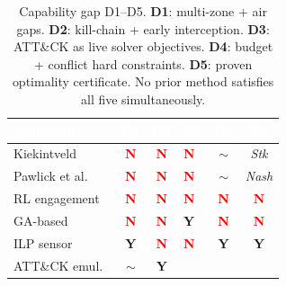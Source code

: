 \documentclass[journal]{IEEEtran}
\begin{document}
\begin{table}[!htb]
\caption{Capability gap D1--D5. \textbf{D1}: multi-zone + air gaps.
  \textbf{D2}: kill-chain + early interception. \textbf{D3}: ATT\&CK
  as live solver objectives. \textbf{D4}: budget + conflict hard
  constraints. \textbf{D5}: proven optimality certificate.
  No prior method satisfies all five simultaneously.}
\label{tab:capability}
\centering
\small
\renewcommand{\arraystretch}{1.2}
\setlength{\tabcolsep}{3pt}
\begin{tabular}{lcc>{\centering\arraybackslash}p{1.0cm}cc}
\toprule
\rowcolor{capHeader}
\textcolor{white}{\textbf{Approach}} &
\textcolor{white}{\textbf{D1}} &
\textcolor{white}{\textbf{D2}} &
\textcolor{white}{\textbf{D3}} &
\textcolor{white}{\textbf{D4}} &
\textcolor{white}{\textbf{D5}} \\
\midrule
Kiekintveld~\cite{kiekintveld2015} &
  \cellcolor{capRed}\textcolor{red}{\textbf{N}} &
  \cellcolor{capRed}\textcolor{red}{\textbf{N}} &
  \cellcolor{capRed}\textcolor{red}{\textbf{N}} &
  \cellcolor{capYellow}$\sim$ &
  \cellcolor{capYellow}\textit{Stk} \\
Pawlick et al.~\cite{pawlick2019} &
  \cellcolor{capRed}\textcolor{red}{\textbf{N}} &
  \cellcolor{capRed}\textcolor{red}{\textbf{N}} &
  \cellcolor{capRed}\textcolor{red}{\textbf{N}} &
  \cellcolor{capYellow}$\sim$ &
  \cellcolor{capYellow}\textit{Nash} \\
RL engagement~\cite{huang2019} &
  \cellcolor{capRed}\textcolor{red}{\textbf{N}} &
  \cellcolor{capRed}\textcolor{red}{\textbf{N}} &
  \cellcolor{capRed}\textcolor{red}{\textbf{N}} &
  \cellcolor{capRed}\textcolor{red}{\textbf{N}} &
  \cellcolor{capRed}\textcolor{red}{\textbf{N}} \\
GA-based~\cite{hemberg2018} &
  \cellcolor{capRed}\textcolor{red}{\textbf{N}} &
  \cellcolor{capRed}\textcolor{red}{\textbf{N}} &
  \cellcolor{capGreen}\textcolor{green!60!black}{\textbf{Y}} &
  \cellcolor{capRed}\textcolor{red}{\textbf{N}} &
  \cellcolor{capRed}\textcolor{red}{\textbf{N}} \\
ILP sensor~\cite{saha2015} &
  \cellcolor{capGreen}\textcolor{green!60!black}{\textbf{Y}} &
  \cellcolor{capRed}\textcolor{red}{\textbf{N}} &
  \cellcolor{capRed}\textcolor{red}{\textbf{N}} &
  \cellcolor{capGreen}\textcolor{green!60!black}{\textbf{Y}} &
  \cellcolor{capGreen}\textcolor{green!60!black}{\textbf{Y}} \\
ATT\&CK emul.~\cite{applebaum2016} &
  \cellcolor{capYellow}$\sim$ &
  \cellcolor{capGreen}\textcolor{green!60!black}{\textbf{Y}} &

\end{tabular}
\end{table}
\end{document}
